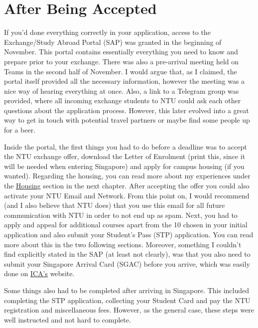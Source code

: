\section*{After Being Accepted}
If you'd done everything correctly in your application, access to the Exchange/Study Abroad Portal (SAP) was granted in the beginning of November. This portal contains essentially everything you need to know and prepare prior to your exchange. There was also a pre-arrival meeting held on Teams in the second half of November. I would argue that, as I claimed, the portal itself provided all the necessary information, however the meeting was a nice way of hearing everything at once. Also, a link to a Telegram group was provided, where all incoming exchange students to NTU could ask each other questions about the application process. However, this later evolved into a great way to get in touch with potential travel partners or maybe find some people up for a beer.

Inside the portal, the first things you had to do before a deadline was to accept the NTU exchange offer, download the Letter of Enrolment (print this, since it will be needed when entering Singapore) and apply for campus housing (if you wanted). Regarding the housing, you can read more about my experiences under the \hyperref[housing]{Housing} section in the next chapter. After accepting the offer you could also activate your NTU Email and Network. From this point on, I would recommend (and I also believe that NTU does) that you use this email for all future communication with NTU in order to not end up as spam. Next, you had to apply and appeal for additional courses apart from the 10 chosen in your initial application and also submit your Student's Pass (STP) application. You can read more about this in the two following sections. Moreover, something I couldn't find explicitly stated in the SAP (at least not clearly), was that you also need to submit your Singapore Arrival Card (SGAC) before you arrive, which was easily done on \href{https://eservices.ica.gov.sg/sgarrivalcard/}{ICA's} website.

Some things also had to be completed after arriving in Singapore. This included completing the STP application, collecting your Student Card and pay the NTU registration and miscellaneous fees. However, as the general case, these steps were well instructed and not hard to complete.

